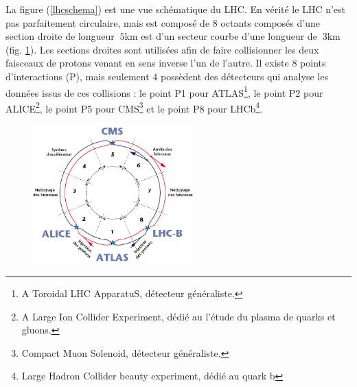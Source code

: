 La figure (\ref{lhcschema}) est une vue schématique du LHC. En vérité le LHC n'est pas parfaitement circulaire, mais est composé de $8$ octants composés d'une section droite de longueur $~5$km est d'un secteur courbe d'une longueur de $~3$km (fig. \ref{octants}). Les sections droites sont utilisées afin de faire collisionner les deux faisceaux de protons venant en sens inverse l'un de l'autre. Il existe $8$ points d'interactions (P), mais seulement $4$ possèdent des détecteurs qui analyse les données issus de ces collisions : le point P1 pour ATLAS\footnote{A Toroidal LHC ApparatuS, détecteur généraliste.}, le point P2 pour ALICE\footnote{A Large Ion Collider Experiment, dédié au l'étude du plasma de quarks et gluons.}, le point P5 pour CMS\footnote{Compact Muon Solenoid, détecteur généraliste.} et le point P8 pour LHCb\footnote{Large Hadron Collider beauty experiment, dédié au quark b}.
\begin{figure}
  	\centering
	\includegraphics[width=0.55\textwidth]{LHC/lhc-schematic.jpg}
  	\label{octants}
\end{figure}
